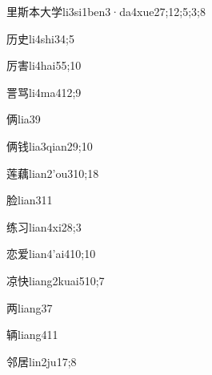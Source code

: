 \begin{verbete}{里斯本大学}{li3si1ben3·da4xue2}{7;12;5;3;8}
\end{verbete}
\begin{verbete}{历史}{li4shi3}{4;5}
\end{verbete}
\begin{verbete}{厉害}{li4hai5}{5;10}
\end{verbete}
\begin{verbete}{詈骂}{li4ma4}{12;9}
\end{verbete}
\begin{verbete}{俩}{lia3}{9}
\end{verbete}
\begin{verbete}{俩钱}{lia3qian2}{9;10}
\end{verbete}
\begin{verbete}{莲藕}{lian2'ou3}{10;18}
\end{verbete}
\begin{verbete}{脸}{lian3}{11}
\end{verbete}
\begin{verbete}{练习}{lian4xi2}{8;3}
\end{verbete}
\begin{verbete}{恋爱}{lian4'ai4}{10;10}
\end{verbete}
\begin{verbete}{凉快}{liang2kuai5}{10;7}
\end{verbete}
\begin{verbete}{两}{liang3}{7}
\end{verbete}
\begin{verbete}{辆}{liang4}{11}
\end{verbete}
\begin{verbete}{邻居}{lin2ju1}{7;8}
\end{verbete}
